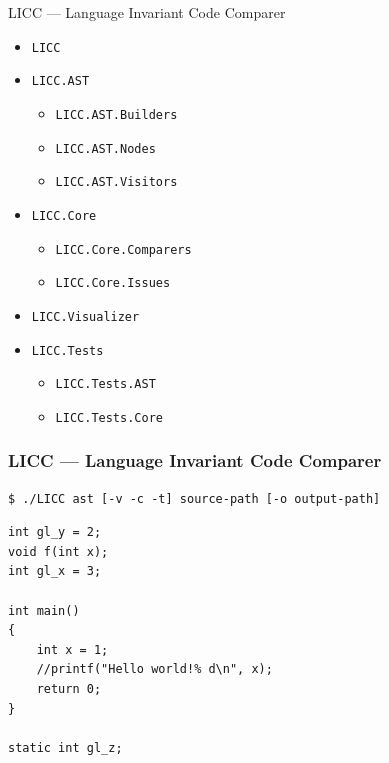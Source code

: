 \documentclass{beamer}
\begin{document}
\begin{frame}{LICC --- Language Invariant Code Comparer}
    \begin{itemize}
        \item \texttt{LICC}
        \item \texttt{LICC.AST}
        \begin{itemize}
            \item \texttt{LICC.AST.Builders} 
            \item \texttt{LICC.AST.Nodes}
            \item \texttt{LICC.AST.Visitors} 
        \end{itemize}
        \item \texttt{LICC.Core}
        \begin{itemize}
            \item \texttt{LICC.Core.Comparers} 
            \item \texttt{LICC.Core.Issues}
        \end{itemize}
        \item \texttt{LICC.Visualizer}
        \item \texttt{LICC.Tests}
        \begin{itemize}
            \item \texttt{LICC.Tests.AST} 
            \item \texttt{LICC.Tests.Core}
        \end{itemize}
    \end{itemize}
\end{frame}

\begin{frame}[fragile]
    \frametitle{LICC --- Language Invariant Code Comparer}
\begin{lstlisting}[numbers=none,language={}]
$ ./LICC ast [-v -c -t] source-path [-o output-path]
\end{lstlisting}
\begin{lstlisting}
int gl_y = 2;
void f(int x);
int gl_x = 3;

int main()
{
    int x = 1;
    //printf("Hello world!% d\n", x);
    return 0;
}

static int gl_z;
\end{lstlisting}
\end{frame}
\end{document}
